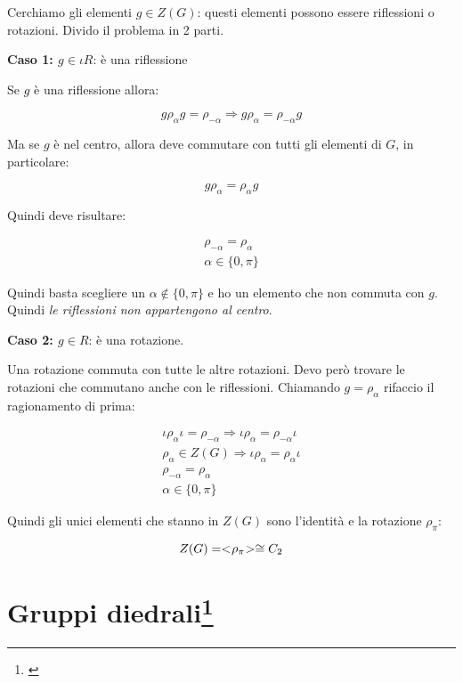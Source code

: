 Cerchiamo gli elementi $g \in Z(G)$: questi elementi possono essere riflessioni o rotazioni. Divido il problema in 2 parti.

\textbf{Caso 1: $g \in \iota R$}: è una riflessione

Se $g$ è una riflessione allora:

\begin{equation}
	g \rho_\alpha g = \rho_{-\alpha} \Longrightarrow g \rho_\alpha = \rho_{-\alpha} g
\end{equation}

Ma se $g$ è nel centro, allora deve commutare con tutti gli elementi di $G$, in particolare:

\begin{equation}
	g\rho_\alpha = \rho_\alpha g
\end{equation}

Quindi deve risultare:

\begin{gather}
	\rho_{-\alpha} = \rho_\alpha \\
	\alpha \in \{0, \pi\}
\end{gather}

Quindi basta scegliere un $\alpha \not\in \{0, \pi\}$ e ho un elemento che non commuta con $g$. Quindi \emph{le riflessioni non appartengono al centro}.

\textbf{Caso 2: $g \in R$}: è una rotazione.

Una rotazione commuta con tutte le altre rotazioni. Devo però trovare le rotazioni che commutano anche con le riflessioni. Chiamando $g = \rho_\alpha$ rifaccio il ragionamento di prima:

\begin{gather}
	\iota \rho_\alpha \iota = \rho_{-\alpha} \Longrightarrow \iota \rho_\alpha = \rho_{-\alpha} \iota \\
	\rho_\alpha \in Z(G) \Longrightarrow \iota\rho_\alpha = \rho_\alpha \iota \\
	\rho_{-\alpha} = \rho_\alpha \\
	\alpha \in \{0, \pi\}
\end{gather}

Quindi gli unici elementi che stanno in $Z(G)$ sono l'identità e la rotazione $\rho_\pi$:

\begin{equation}
	\label{eqn:Isometrie_Z_G}
	Z(G) = < \negmedspace \rho_\pi \negmedspace > \cong C_2
\end{equation}

\section[Gruppi diedrali]{Gruppi diedrali\protect\footnote{\cite[7 novembre 2021]{lucchini}}}

